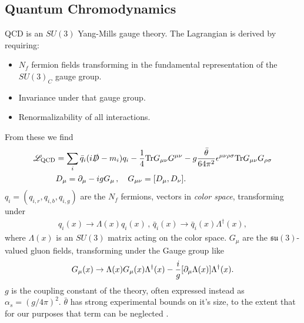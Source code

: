 \subsection{Quantum Chromodynamics}
\label{sec:qcd}

QCD is an $SU(3)$ Yang-Mills gauge theory. The Lagrangian is derived by requiring:
\begin{itemize}
\item
  $N_f$ fermion fields transforming in the fundamental representation of the $SU(3)_C$ gauge group.
\item
  Invariance under that gauge group.
\item
  Renormalizability of all interactions.
\end{itemize}
From these we find \cite{Schwartz:2013pla}
\begin{align}
  \mathscr{L}_{\text{QCD}} &= \sum_i \bar{q}_i (i \slashed{D} - m_i) q_i - {1\over 4} \text{Tr}G_{\mu\nu} G^{\mu\nu} - g{\bar{\theta}\over 64 \pi^2} \epsilon^{\mu\nu\rho\sigma} \text{Tr}G_{\mu\nu} G_{\rho\sigma} \\
  &D_{\mu} = \partial_{\mu} - i g G_{\mu} \,,\quad
  G_{\mu\nu} = [ D_{\mu}, D_{\nu} ].
  \nonumber
\end{align}
$q_i = ( q_{i,r}, q_{i,b}, q_{i,g} )$ are the $N_f$ fermions, vectors in {\it{color space}}, transforming under
\begin{align}
  q_i(x) \to \Lambda(x)q_i(x) \,,\, \bar{q}_i(x) \to \bar{q}_i(x) \Lambda^{\dagger}(x),
  \label{eq:quark_gauge_trans}
\end{align}
where $\Lambda(x)$ is an $SU(3)$ matrix acting on the color space. $G_{\mu}$ are the $\mathfrak{su}(3)$-valued gluon fields, transforming under the Gauge group like
\begin{align}
  G_{\mu}(x) \to \Lambda(x) G_{\mu}(x) \Lambda^{\dagger}(x) - {i\over g} [ \partial_{\mu} \Lambda(x) ] \Lambda^{\dagger}(x).
  \label{eq:G_gauge_trans}
\end{align}
$g$ is the coupling constant of the theory, often expressed instead as $\alpha_s = (g/4\pi)^2$. $\bar{\theta}$ has strong experimental bounds on it's size, to the extent that for our purposes that term can be neglected \cite{ALTAREV1992242}.

